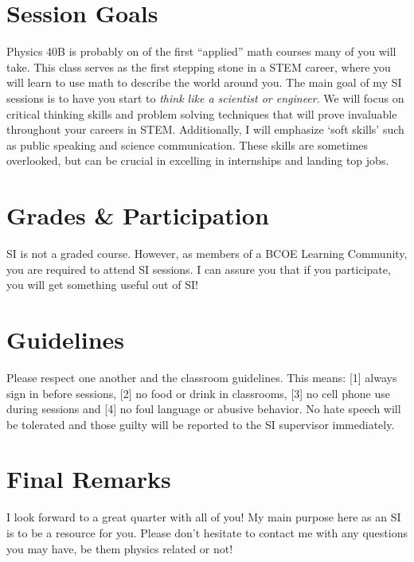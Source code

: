 \documentclass[11pt]{article}
\begin{document}
\section*{Session Goals}
Physics 40B is probably on of the first ``applied'' math courses many of you will take. This class serves as the first stepping stone in a STEM career, where you will learn to use math to describe the world around you.
The main goal of my SI sessions is to have you start to \emph{think like a scientist or engineer}. We will focus on critical thinking skills and problem solving techniques that will prove invaluable throughout your careers in STEM.
Additionally, I will emphasize `soft skills' such as public speaking and science communication. These skills are sometimes overlooked, but can be crucial in excelling in internships and landing top jobs.

\section*{Grades \& Participation}

SI is not a graded course. However, as members of a \textsc{BCOE} Learning Community, you are required to attend SI sessions. I can assure you that if you participate, you will get something useful out of SI!

\section*{Guidelines}

Please respect one another and the classroom guidelines.  
This means: [1] always sign in before sessions, [2] no food or drink in classrooms, [3] no cell phone use during sessions and [4] no foul language or abusive behavior.
No hate speech will be tolerated and those guilty will be reported to the SI supervisor immediately. 

\section*{Final Remarks}

I look forward to a great quarter with all of you! My main purpose here as an SI is to be a resource for you. Please don't hesitate to contact me with any questions you may have, be them physics related or not!
\end{document}
